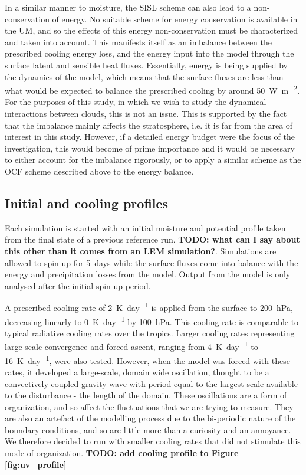 \documentclass[11pt,a4paper]{article}
\newcommand\todo[1]{\textbf{TODO: #1}}
\begin{document}
In a similar manner to moisture, the SISL scheme can also lead to a non-conservation of energy. No suitable scheme for energy conservation is available in the UM, and so the effects of this energy non-conservation must be characterized and taken into account. This manifests itself as an imbalance between the prescribed cooling energy loss, and the energy input into the model through the surface latent and sensible heat fluxes. Essentially, energy is being supplied by the dynamics of the model, which means that the surface fluxes are less than what would be expected to balance the prescribed cooling by around \SI{50}{W.m^{-2}}.
For the purposes of this study, in which we wish to study the dynamical interactions between clouds, this is not an issue. This is supported by the fact that the imbalance mainly affects the stratosphere, i.e. it is far from the area of interest in this study. However, if a detailed energy budget were the focus of the investigation, this would become of prime importance and it would be necessary to either account for the imbalance rigorously, or to apply a similar scheme as the OCF scheme described above to the energy balance. 

\subsection{Initial and cooling profiles}

Each simulation is started with an initial moisture and potential profile taken from the final state of a previous reference run. \todo{what can I say about this other than it comes from an LEM simulation?}. Simulations are allowed to spin-up for \SI{5}{days} while the surface fluxes come into balance with the energy and precipitation losses from the model. Output from the model is only analysed after the initial spin-up period.

A prescribed cooling rate of \SI{2}{K.day^{-1}} is applied from the surface to \SI{200}{hPa}, decreasing linearly to \SI{0}{K.day^{-1}} by \SI{100}{hPa}. This cooling rate is comparable to typical radiative cooling rates over the tropics. Larger cooling rates representing large-scale convergence and forced ascent, ranging from \SI{4}{K.day^{-1}} to \SI{16}{K.day^{-1}}, were also tested. However, when the model was forced with these rates, it developed a large-scale, domain wide oscillation, thought to be a convectively coupled gravity wave with period equal to the largest scale available to the disturbance - the length of the domain. These oscillations are a form of organization, and so affect the fluctuations that we are trying to measure. They are also an artefact of the modelling process due to the bi-periodic nature of the boundary conditions, and so are little more than a curiosity and an annoyance. We therefore decided to run with smaller cooling rates that did not stimulate this mode of organization.
\todo{add cooling profile to Figure \ref{fig:uv_profile}}
\end{document}
